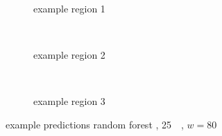 \begin{figure}[p] %
    \begin{subfigure}{\textwidth}
        \centering
        \caption{example  region 1} \label{fig:results:randomforest_masterproject_r1}
    \end{subfigure}\\[3mm]
    \begin{subfigure}{\textwidth}
        \centering
        \caption{example region 2} \label{fig:results:randomforest_masterproject_r2}
    \end{subfigure}\\[3mm]
    \begin{subfigure}{\textwidth}
        \centering
        \caption{example region 3} \label{fig:results:randomforest_masterproject_r3}
    \end{subfigure}
    \caption{example predictions random forest \cite{Krauth2020}, \SI{25}{\kilo\bp}, $w=80$} 
     \label{fig:results:randomforest_masterproject_matrices}
\end{figure}
